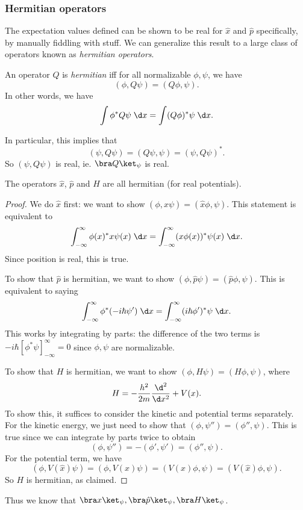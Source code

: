 \documentclass[a4paper]{article}
\begin{document}
\subsubsection{Hermitian operators}
The expectation values defined can be shown to be real for $\hat{x}$ and $\hat{p}$ specifically, by manually fiddling with stuff. We can generalize this result to a large class of operators known as \emph{hermitian operators}.
\begin{defi}
  An operator $Q$ is \emph{hermitian} iff for all normalizable $\phi, \psi$, we have
  \[
    (\phi, Q\psi) = (Q\phi, \psi).
  \]
  In other words, we have
  \[
    \int \phi^* Q\psi \;\d x= \int(Q\phi)^* \psi \;\d x.
  \]
\end{defi}
In particular, this implies that
\[
  (\psi, Q\psi) = (Q\psi, \psi) = (\psi, Q\psi)^*.
\]
So $(\psi, Q\psi)$ is real, ie. $\bra Q\ket_\psi$ is real.
\begin{prop}
  The operators $\hat{x}$, $\hat{p}$ and $H$ are all hermitian (for real potentials).
\end{prop}

\begin{proof}
  We do $\hat{x}$ first: we want to show $(\phi, \hat{x} \psi) = (\hat{x}\phi, \psi)$. This statement is equivalent to
  \[
    \int_{-\infty}^\infty \phi(x)^* x\psi (x)\;\d x = \int_{-\infty}^\infty (x\phi(x))^* \psi(x)\;\d x.
  \]
  Since position is real, this is true.

  To show that $\hat{p}$ is hermitian, we want to show $(\phi, \hat{p} \psi) = (\hat{p}\phi, \psi)$. This is equivalent to saying
  \[
    \int_{-\infty}^\infty \phi^*(-i\hbar \psi')\;\d x = \int_{-\infty}^\infty (i\hbar \phi')^*\psi \;\d x.
  \]
  This works by integrating by parts: the difference of the two terms is $-i\hbar [\phi^*\psi]_{-\infty}^\infty = 0$ since $\phi, \psi$ are normalizable.

  To show that $H$ is hermitian, we want to show $(\phi, H\psi) = (H\phi, \psi)$, where
  \[
    H = -\frac{h^2}{2m}\frac{\d^2}{\d x^2} + V(x).
  \]
  To show this, it suffices to consider the kinetic and potential terms separately. For the kinetic energy, we just need to show that $(\phi, \psi'') = (\phi'', \psi)$. This is true since we can integrate by parts twice to obtain
  \[
    (\phi, \psi'') = -(\phi', \psi') = (\phi'', \psi).
  \]
  For the potential term, we have
  \[
    (\phi, V(\hat{x})\psi) = (\phi, V(x) \psi) = (V(x)\phi, \psi) = (V(\hat{x})\phi, \psi).
  \]
  So $H$ is hermitian, as claimed.
\end{proof}
Thus we know that $\bra x\ket_\psi, \bra \hat{p}\ket_\psi, \bra H\ket_\psi$.
\end{document}
